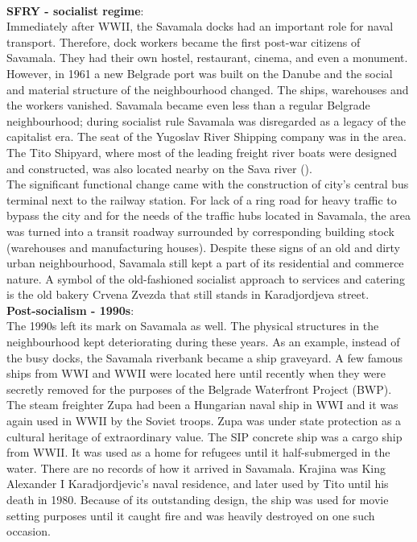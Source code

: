 \documentclass[11pt]{report}
\begin{document}
{{{{\\
\textbf{SFRY - socialist regime}:
\\
Immediately  after  WWII,  the Savamala  docks  had an  important  role  for  naval  transport.  Therefore, dock workers became the first post-war citizens of Savamala.  They had their own hostel, restaurant,  cinema,  and  even  a  monument.  However,  in  1961  a  new  Belgrade  port was built on the Danube and the social and material structure of the neighbourhood changed. The ships, warehouses and the workers vanished.  Savamala became even less than a regular  Belgrade  neighbourhood;  during   socialist  rule  Savamala  was  disregarded  as  a  legacy of the capitalist era.
The seat of the Yugoslav River Shipping company was in the area. The Tito Shipyard, where most of the leading freight river boats were designed and constructed, was also located nearby on the Sava river (\href{Markovic}{\citealt{markovic_wide_2013}}). 
\\

The significant functional change came with the construction of city’s central bus terminal next to the railway station. For lack of a ring road for heavy traffic to bypass the city and for the needs of the traffic hubs located in Savamala, the area was turned into a transit roadway  surrounded  by  corresponding building stock (warehouses and manufacturing houses). Despite  these  signs  of  an  old  and  dirty urban  neighbourhood,  Savamala  still  kept  a  part  of  its  residential  and  commerce  nature. A symbol of the old-fashioned socialist approach to services and catering is the old bakery Crvena Zvezda that still stands in Karadjordjeva street.
\\
\textbf{Post-socialism - 1990s}:
\\
The 1990s left its mark on Savamala as well. The physical structures in the neighbourhood kept deteriorating during these years. As an example, instead of the busy docks, the Savamala riverbank became a ship graveyard. A few famous ships from WWI and WWII were located here until recently when they were secretly removed for the purposes of the Belgrade Waterfront Project  (BWP).
\\

The steam freighter Zupa had been a Hungarian naval ship in WWI and it was again used in WWII by the Soviet troops. Zupa was under state protection as a cultural heritage of extraordinary value. The SIP concrete ship was a cargo ship from WWII. It was used as a home for refugees until it half-submerged in the water. There are no records of how it arrived in Savamala. Krajina was King Alexander I Karadjordjevic’s naval residence, and later used by Tito until his death in 1980. Because of its outstanding design, the ship was used for movie setting purposes until it caught fire and was heavily destroyed on one such occasion.
\\

}}}}
\end{document}
